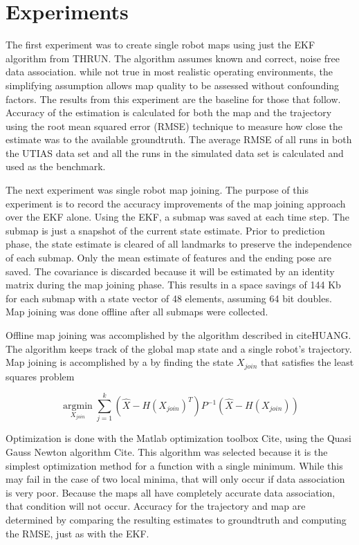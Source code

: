 \documentclass[12pt]{report}
\begin{document}
\section{Experiments}
The first experiment was to create single robot maps using just the
EKF algorithm from THRUN. The algorithm assumes known and correct,
noise free data association. while not true in most realistic
operating environments, the simplifying assumption allows map quality
to be assessed without confounding factors. The results from this
experiment are the baseline for those that follow. Accuracy of the
estimation is calculated for both the map and the trajectory using the
root mean squared error (RMSE) technique to measure how close the
estimate was to the available groundtruth. The average RMSE of all
runs in both the UTIAS data set and all the runs in the simulated data
set is calculated and used as the benchmark.

The next experiment was single robot map joining. The purpose of this
experiment is to record the accuracy improvements of the map joining
approach over the EKF alone. Using the EKF, a submap was saved at each
time step. The submap is just a snapshot of the current state
estimate. Prior to prediction phase, the state estimate is cleared of
all landmarks to preserve the independence of each submap. Only the
mean estimate of features and the ending pose are saved. The
covariance is discarded because it will be estimated by an identity
matrix during the map joining phase. This results in a space savings
of 144 Kb for each submap with a state vector of 48 elements, assuming
64 bit doubles. Map joining was done offline after all submaps were
collected.

Offline map joining was accomplished by the algorithm described in
cite{HUANG}. The algorithm keeps track of the global map state and a
single robot's trajectory. Map joining is accomplished by a by finding
the state $X_{join}$ that satisfies the least squares problem

\begin{equation}
\underset{X_{join}}{\operatorname{argmin}} \sum \limits_{j=1}^k
(\hat{X} - H(X_{join})^T) P^{-1} (\hat{X} - H(X_{join}))
\end{equation}

Optimization is done with the Matlab optimization toolbox {Cite},
using the Quasi Gauss Newton algorithm {Cite}. This algorithm was
selected because it is the simplest optimization method for a function
with a single minimum. While this may fail in the case of two local
minima, that will only occur if data association is very poor. Because
the maps all have completely accurate data association, that condition
will not occur. Accuracy for the trajectory and map are determined by
comparing the resulting estimates to groundtruth and computing the
RMSE, just as with the EKF.
\end{document}
